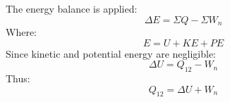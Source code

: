 The energy balance is applied:  
\[
\Delta E = \Sigma Q - \Sigma W_n
\]  
Where:  
\[
E = U + KE + PE
\]  
Since kinetic and potential energy are negligible:  
\[
\Delta U = Q_{12} - W_n
\]  
Thus:  
\[
Q_{12} = \Delta U + W_n
\]